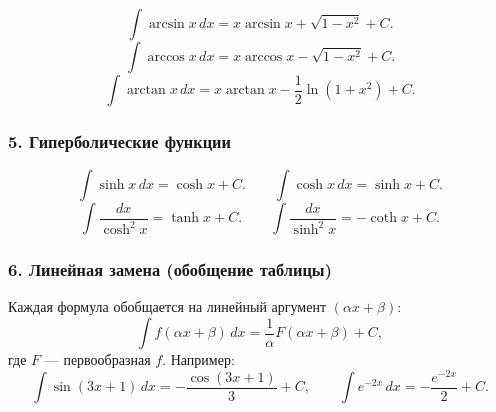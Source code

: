\[
\int \arcsin x\,dx = x\arcsin x + \sqrt{1-x^2} + C.
\]
\[
\int \arccos x\,dx = x\arccos x - \sqrt{1-x^2} + C.
\]
\[
\int \arctan x\,dx = x\arctan x - \frac{1}{2}\ln(1+x^2) + C.
\]

\subsubsection*{5. Гиперболические функции}

\[
\int \sinh x\,dx = \cosh x + C. \qquad
\int \cosh x\,dx = \sinh x + C.
\]
\[
\int \frac{dx}{\cosh^2 x} = \tanh x + C. \qquad
\int \frac{dx}{\sinh^2 x} = -\coth x + C.
\]

\subsubsection*{6. Линейная замена (обобщение таблицы)}

Каждая формула обобщается на линейный аргумент $(\alpha x + \beta)$:
\[
\int f(\alpha x + \beta)\,dx = \frac{1}{\alpha} F(\alpha x + \beta) + C,
\]
где $F$ — первообразная $f$. Например:
\[
\int \sin(3x+1)\,dx = -\frac{\cos(3x+1)}{3} + C,\qquad
\int e^{-2x}\,dx = -\frac{e^{-2x}}{2} + C.
\]